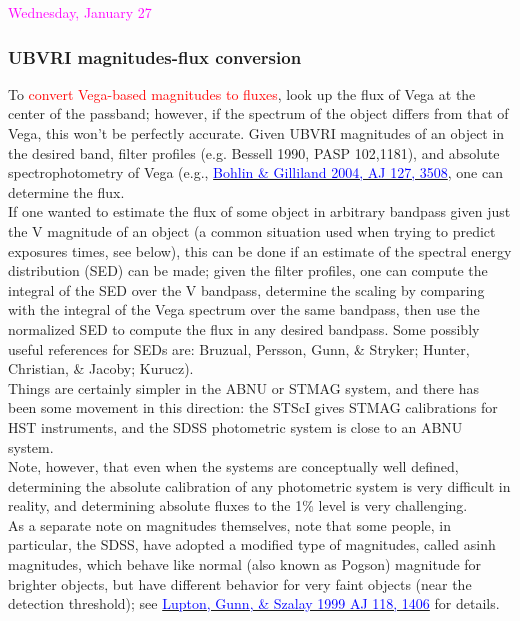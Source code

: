 \documentclass[12pt]{article}
\begin{document}
\noindent \textcolor{magenta}{Wednesday, January 27}

\subsubsection*{UBVRI magnitudes-flux conversion
}
To \textcolor{red}{convert Vega-based magnitudes to fluxes},
look up the flux of Vega at the center of the passband;
however, if the spectrum of the object
differs from that of Vega, this won't be perfectly accurate.
Given UBVRI magnitudes of an object in the desired band, filter profiles
(e.g. Bessell 1990, PASP 102,1181), and absolute spectrophotometry of
Vega (e.g., \href{http://adsabs.harvard.edu/abs/2004AJ....127.3508B}
{\textcolor{blue}{Bohlin \& Gilliland 2004, AJ 127, 3508}},
one can determine the flux.\\

\noindent If one wanted to estimate the flux of some object in
arbitrary bandpass given just the V magnitude of an object (a common
situation used when trying to predict exposures times, see below),
this can be done if an estimate of the spectral energy distribution
(SED) can be made; given the filter profiles, one can compute the
integral of the SED over the V bandpass, determine the scaling by
comparing with the integral of the Vega spectrum over the same
bandpass, then use the normalized SED to compute the flux in any
desired bandpass. Some possibly useful references for SEDs are:
Bruzual, Persson, Gunn, \& Stryker; Hunter, Christian, \& Jacoby;
Kurucz).\\

\noindent Things are certainly simpler in the ABNU or STMAG system, and
there has been some movement in this direction: the STScI gives STMAG
calibrations for HST instruments, and the SDSS photometric system is
close to an ABNU system.\\

\noindent Note, however, that even when the systems are conceptually
well defined, determining the absolute calibration of any photometric
system is very difficult in reality, and determining absolute fluxes
to the 1\% level is very challenging.\\

\noindent As a separate note on magnitudes themselves, note that some
people, in particular, the SDSS, have adopted a modified type of
magnitudes, called asinh magnitudes, which behave like normal (also
known as Pogson) magnitude for brighter objects, but have different
behavior for very faint objects (near the detection threshold); see
\href{http://adsabs.harvard.edu/abs/1999AJ....118.1406L}
{\textcolor{blue}{Lupton, Gunn, \& Szalay 1999 AJ 118, 1406}}
for details.
\end{document}
